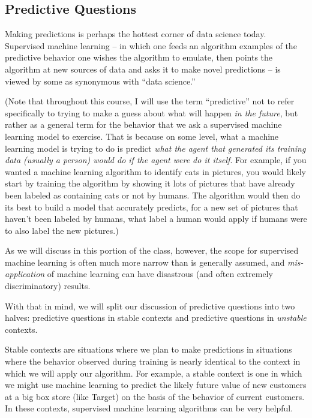 \documentclass[12pt]{article}
\begin{document}
\subsection{Predictive Questions}

Making predictions is perhaps the hottest corner of data science today. Supervised machine learning -- in which one feeds an algorithm examples of the predictive behavior one wishes the algorithm to emulate, then points the algorithm at new sources of data and asks it to make novel predictions -- is viewed by some as synonymous with ``data science.''

(Note that throughout this course, I will use the term ``predictive'' not to refer specifically to trying to make a guess about what will happen \emph{in the future}, but rather as a general term for the behavior that we ask a supervised machine learning model to exercise. That is because on some level, what a machine learning model is trying to do is predict \emph{what the agent that generated its training data (usually a person) would do if the agent were do it itself}. For example, if you wanted a machine learning algorithm to identify cats in pictures, you would likely start by training the algorithm by showing it lots of pictures that have already been labeled as containing cats or not by humans. The algorithm would then do its best to build a model that accurately predicts, for a new set of pictures that haven't been labeled by humans, what label a human  would apply if humans were to also label the new pictures.)

As we will discuss in this portion of the class, however, the scope for supervised machine learning is often much more narrow than is generally assumed, and \emph{mis-application} of machine learning can have disastrous (and often extremely discriminatory) results.

With that in mind, we will split our discussion of predictive questions into two halves: predictive questions in stable contexts and predictive questions in \emph{unstable} contexts.

Stable contexts are situations where we plan to make predictions in situations where the behavior observed during training is nearly identical to the context in which we will apply our algorithm. For example, a stable context is one in which we might use machine learning to predict the likely future value of new customers at a big box store (like Target) on the basis of the behavior of current customers. In these contexts, supervised machine learning algorithms can be very helpful.
\end{document}
